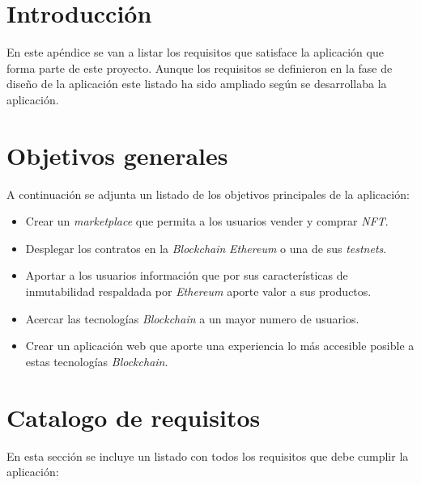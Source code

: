 
\section{Introducción}

En este apéndice se van a listar los requisitos que satisface la aplicación que forma parte de este proyecto. Aunque los requisitos se definieron en la fase de diseño de la aplicación este listado ha sido ampliado según se desarrollaba la aplicación.


\section{Objetivos generales}
A continuación se adjunta un listado de los objetivos principales de la aplicación:
\begin{itemize}
    \item Crear un \textit{marketplace} que permita a los usuarios vender y comprar \textit{NFT}.
    \item Desplegar los contratos en la \textit{Blockchain} \textit{Ethereum} o una de sus \textit{testnets}.
    \item Aportar a los usuarios información que por sus características de inmutabilidad respaldada por \textit{Ethereum} aporte valor a sus productos.
    \item Acercar las tecnologías \textit{Blockchain} a un mayor numero de usuarios.
    \item Crear un aplicación web que aporte una experiencia lo más accesible posible a estas tecnologías \textit{Blockchain}.
    
\end{itemize}

\section{Catalogo de requisitos}

En esta sección se incluye un listado con todos los requisitos que debe cumplir la aplicación:

